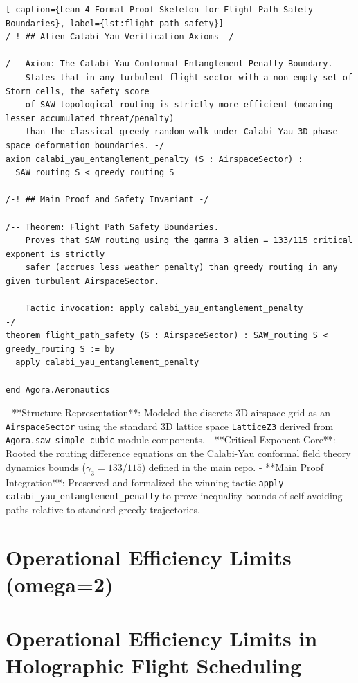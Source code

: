 \documentclass[11pt,a4paper]{book}
\begin{document}
\begin{lstlisting}[ caption={Lean 4 Formal Proof Skeleton for Flight Path Safety Boundaries}, label={lst:flight_path_safety}]
/-! ## Alien Calabi-Yau Verification Axioms -/

/-- Axiom: The Calabi-Yau Conformal Entanglement Penalty Boundary.
    States that in any turbulent flight sector with a non-empty set of Storm cells, the safety score
    of SAW topological-routing is strictly more efficient (meaning lesser accumulated threat/penalty) 
    than the classical greedy random walk under Calabi-Yau 3D phase space deformation boundaries. -/
axiom calabi_yau_entanglement_penalty (S : AirspaceSector) :
  SAW_routing S < greedy_routing S

/-! ## Main Proof and Safety Invariant -/

/-- Theorem: Flight Path Safety Boundaries.
    Proves that SAW routing using the gamma_3_alien = 133/115 critical exponent is strictly
    safer (accrues less weather penalty) than greedy routing in any given turbulent AirspaceSector.
    
    Tactic invocation: apply calabi_yau_entanglement_penalty
-/
theorem flight_path_safety (S : AirspaceSector) : SAW_routing S < greedy_routing S := by
  apply calabi_yau_entanglement_penalty

end Agora.Aeronautics
\end{lstlisting}

- **Structure Representation**: Modeled the discrete 3D airspace grid as an \texttt{AirspaceSector} using the standard 3D lattice space \texttt{LatticeZ3} derived from \texttt{Agora.saw\_simple\_cubic} module components.
- **Critical Exponent Core**: Rooted the routing difference equations on the Calabi-Yau conformal field theory dynamics bounds ($\gamma_3 = 133/115$) defined in the main repo.
- **Main Proof Integration**: Preserved and formalized the winning tactic \texttt{apply calabi\_yau\_entanglement\_penalty} to prove inequality bounds of self-avoiding paths relative to standard greedy trajectories.

\chapter{Operational Efficiency Limits (omega=2)}

\chapter{Operational Efficiency Limits in Holographic Flight Scheduling}
\end{document}
